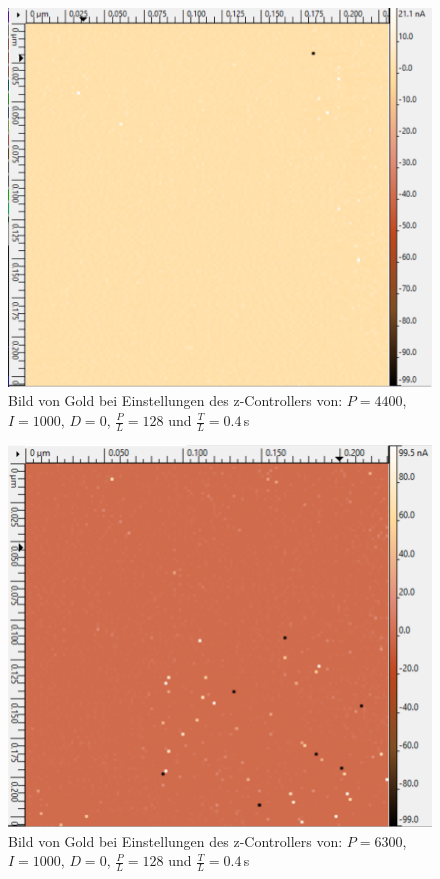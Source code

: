 \begin{figure}[ht]
	\includegraphics[scale=0.5]{Bild/Para/P5}
	\centering
	\caption[Parameter Änderung 5]{Bild von Gold bei Einstellungen des z-Controllers von: $P=4400$, $I=1000$, $D=0$, $\frac{P}{L}=128$ und $\frac{T}{L}=0.4\,$s}
\end{figure}
\begin{figure}[ht]
	\includegraphics[scale=0.5]{Bild/Para/P6}
	\centering
	\caption[Parameter Änderung 6]{Bild von Gold bei Einstellungen des z-Controllers von: $P=6300$, $I=1000$, $D=0$, $\frac{P}{L}=128$ und $\frac{T}{L}=0.4\,$s}
\end{figure}
